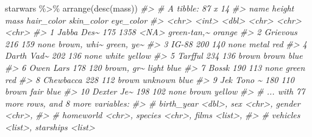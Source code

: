 \documentclass[
]{book}
\newenvironment{Shaded}{\begin{snugshade}}{\end{snugshade}}
\newcommand{\CommentTok}[1]{\textcolor[rgb]{0.56,0.35,0.01}{\textit{#1}}}
\newcommand{\FunctionTok}[1]{\textcolor[rgb]{0.00,0.00,0.00}{#1}}
\newcommand{\NormalTok}[1]{#1}
\newcommand{\SpecialCharTok}[1]{\textcolor[rgb]{0.00,0.00,0.00}{#1}}
\begin{document}
\begin{Shaded}
\begin{Highlighting}[]
\NormalTok{starwars }\SpecialCharTok{\%\textgreater{}\%} 
  \FunctionTok{arrange}\NormalTok{(}\FunctionTok{desc}\NormalTok{(mass))}
\CommentTok{\#\textgreater{} \# A tibble: 87 x 14}
\CommentTok{\#\textgreater{}    name       height  mass hair\_color skin\_color  eye\_color }
\CommentTok{\#\textgreater{}    \textless{}chr\textgreater{}       \textless{}int\textgreater{} \textless{}dbl\textgreater{} \textless{}chr\textgreater{}      \textless{}chr\textgreater{}       \textless{}chr\textgreater{}     }
\CommentTok{\#\textgreater{}  1 Jabba Des\textasciitilde{}    175  1358 \textless{}NA\textgreater{}       green{-}tan,\textasciitilde{} orange    }
\CommentTok{\#\textgreater{}  2 Grievous      216   159 none       brown, whi\textasciitilde{} green, ye\textasciitilde{}}
\CommentTok{\#\textgreater{}  3 IG{-}88         200   140 none       metal       red       }
\CommentTok{\#\textgreater{}  4 Darth Vad\textasciitilde{}    202   136 none       white       yellow    }
\CommentTok{\#\textgreater{}  5 Tarfful       234   136 brown      brown       blue      }
\CommentTok{\#\textgreater{}  6 Owen Lars     178   120 brown, gr\textasciitilde{} light       blue      }
\CommentTok{\#\textgreater{}  7 Bossk         190   113 none       green       red       }
\CommentTok{\#\textgreater{}  8 Chewbacca     228   112 brown      unknown     blue      }
\CommentTok{\#\textgreater{}  9 Jek Tono \textasciitilde{}    180   110 brown      fair        blue      }
\CommentTok{\#\textgreater{} 10 Dexter Je\textasciitilde{}    198   102 none       brown       yellow    }
\CommentTok{\#\textgreater{} \# ... with 77 more rows, and 8 more variables:}
\CommentTok{\#\textgreater{} \#   birth\_year \textless{}dbl\textgreater{}, sex \textless{}chr\textgreater{}, gender \textless{}chr\textgreater{},}
\CommentTok{\#\textgreater{} \#   homeworld \textless{}chr\textgreater{}, species \textless{}chr\textgreater{}, films \textless{}list\textgreater{},}
\CommentTok{\#\textgreater{} \#   vehicles \textless{}list\textgreater{}, starships \textless{}list\textgreater{}}


\end{Highlighting}
\end{Shaded}
\end{document}
